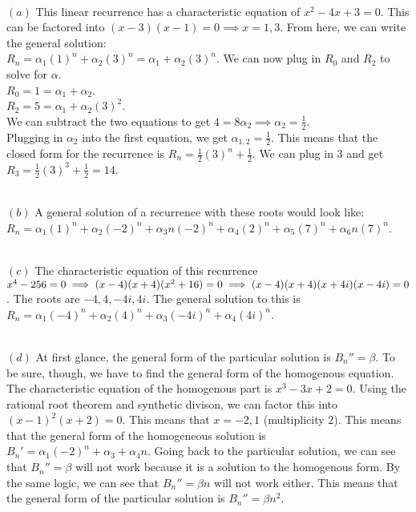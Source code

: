 \documentclass[11pt]{article}
\begin{document}
\begin{solution} \\
	$(a)$ 
		This linear recurrence has a characteristic equation of $x^2 - 4x + 3 = 0$. This can be factored into $(x-3)(x-1) = 0 \implies x = 1, 3$. From here, we can write the general solution: 
		\\ $R_n = \alpha_1(1)^n + \alpha_2(3)^n = \alpha_1 + \alpha_2(3)^n$. We can now plug in $R_0$ and $R_2$ to solve for $\alpha$. 
		\\ $R_0 = 1 = \alpha_1 + \alpha_2$. 
		\\ $R_2 = 5 = \alpha_1 + \alpha_2(3)^2$. 
		\\ We can subtract the two equations to get $4 = 8\alpha_2 \implies \alpha_2 = \frac{1}{2}$.
		\\ Plugging in $\alpha_2$ into the first equation, we get $\alpha_{1,2} = \frac{1}{2}$. This means that the closed form for the recurrence is $R_n = \frac{1}{2}(3)^n + \frac{1}{2}$. We can plug in 3 and get $R_3 = \frac{1}{2}(3)^3 + \frac{1}{2} = 14$. 

	\text{}\\
	$(b)$
		A general solution of a recurrence with these roots would look like: \\ \text{}\quad\quad $R_n = \alpha_1(1)^n + \alpha_2(-2)^n + \alpha_3n(-2)^n + \alpha_4(2)^n + \alpha_5(7)^n + \alpha_6n(7)^n$.

	\text{}\\
	$(c)$
		The characteristic equation of this recurrence $x^4 - 256 = 0 \implies (x-4)(x+4)(x^2+16)=0 \\\implies (x-4)(x+4)(x+4i)(x-4i)=0$. The roots are $-4, 4, -4i, 4i$. The general solution to this is $R_n = \alpha_1(-4)^n + \alpha_2(4)^n + \alpha_3(-4i)^n + \alpha_4(4i)^n$.

	\text{}\\
	$(d)$
		At first glance, the general form of the particular solution is $B_n'' = \beta$. To be sure, though, we have to find the general form of the homogenous equation. The characteristic equation of the homogenous part is $x^3 - 3x + 2 = 0$. Using the rational root theorem and synthetic divison, we can factor this into $(x-1)^2(x+2)=0$. This means that $x = -2, 1$ (multiplicity 2). This means that the general form of the homogeneous solution is $B_n' = \alpha_1 (-2)^n + \alpha_3 + \alpha_4n$. Going back to the particular solution, we can see that $B_n'' = \beta$ will not work because it is a solution to the homogenous form. By the same logic, we can see that $B_n'' = \beta n$ will not work either. This means that the general form of the particular solution is $B_n'' = \beta n^2$.

	\end{solution}
\end{document}
